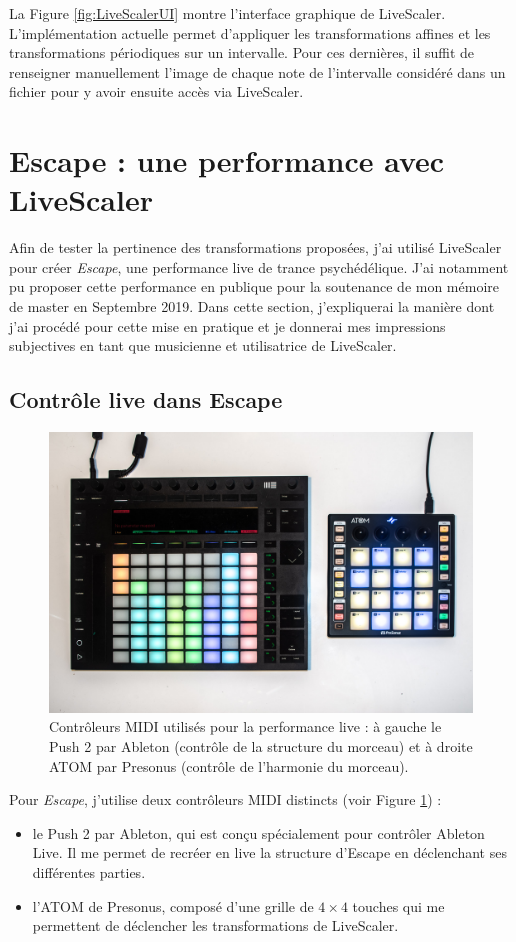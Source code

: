 \documentclass{article}
\begin{document}
La Figure \ref{fig:LiveScalerUI} montre l'interface graphique de LiveScaler. L'implémentation actuelle permet d'appliquer les transformations affines et les transformations périodiques sur un intervalle. Pour ces dernières, il suffit de renseigner manuellement l'image de chaque note de l'intervalle considéré dans un fichier pour y avoir ensuite accès via LiveScaler.





\section{Escape : une performance avec LiveScaler }
Afin de tester la pertinence des transformations proposées, j'ai utilisé LiveScaler pour créer \emph{Escape}, une performance live de trance psychédélique. J'ai notamment pu proposer cette performance en publique pour la soutenance de mon mémoire de master en Septembre 2019. Dans cette section, j'expliquerai la manière dont j'ai procédé pour cette mise en pratique et je donnerai mes impressions subjectives en tant que musicienne et utilisatrice de LiveScaler.


\subsection{Contrôle live dans Escape}
\begin{figure}[htbp]
  \centering
  \includegraphics[width=\columnwidth]{IMGP9899.jpg}
  \caption{Contrôleurs MIDI utilisés pour la performance live : à gauche le Push 2 par Ableton (contrôle de la structure du morceau) et à droite ATOM par Presonus (contrôle de l'harmonie du morceau).\label{fig:controleurs}}
\end{figure}
Pour \emph{Escape}, j'utilise deux contrôleurs MIDI distincts (voir Figure \ref{fig:controleurs}) :
\begin{itemize}
  \item le Push 2 par Ableton, qui est conçu spécialement pour contrôler Ableton Live. Il me permet de recréer en live la structure d'Escape en déclenchant ses différentes parties.
  \item l'ATOM de Presonus, composé d'une grille de $4\times 4$ touches qui me permettent de déclencher les transformations de LiveScaler.
\end{itemize}
\end{document}

